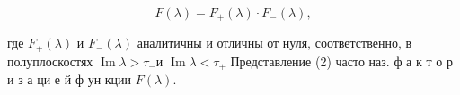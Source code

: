 \documentclass[10pt]{article}
\begin{document}
\[

F(\lambda)=F_{+}(\lambda) \cdot F_{-}(\lambda),

\]



где $F_{+}(\lambda)$ и $F_{-}(\lambda)$ аналитичны и отличны от нуля, соответственно, в полуплоскостях $\operatorname{Im} \lambda>\tau_{-}$и $\operatorname{Im} \lambda<\tau_{+}$ Представление (2) часто наз. ф а к т о р и з а ци е й $ф$ ун кции $F(\lambda)$.
\end{document}
